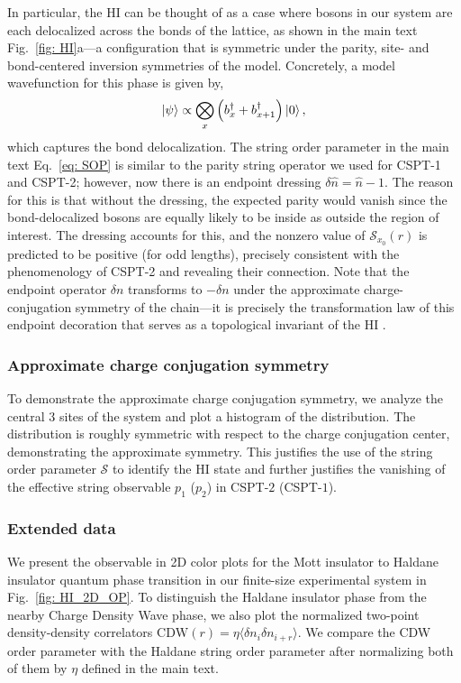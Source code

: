 \documentclass[preprint,superscriptaddress,floatfix, nofootinbib]{revtex4-2}
\begin{document}
In particular, the HI can be thought of as a case where bosons in our system are each delocalized across the bonds of the lattice, as shown in the main text Fig.~\ref{fig: HI}a---a configuration that is symmetric under the parity, site- and bond-centered inversion symmetries of the model.
%
Concretely, a model wavefunction for this phase is given by,
\begin{equation} \label{eq:model-wavefunction}
    \ket{\psi} \propto \bigotimes_{x} \left( b_{x}^{\dagger} + b_{x + 1}^{\dagger} \right) \ket{0},
\end{equation}
which captures the bond delocalization.
%
The string order parameter in the main text Eq.~\eqref{eq: SOP} is similar to the parity string operator we used for CSPT-1 and CSPT-2; however, now there is an endpoint dressing $\delta \hat n = \hat n-1$. The reason for this is that without the dressing, the expected parity would vanish since the bond-delocalized bosons are equally likely to be inside as outside the region of interest. The dressing accounts for this, and the nonzero value of $\mathcal{S}_{x_0} (r)$ is predicted to be positive (for odd lengths), precisely consistent with the phenomenology of CSPT-2 and revealing their connection.
%
Note that the endpoint operator $\delta n$ transforms to $-\delta n$ under the approximate charge-conjugation symmetry of the chain---it is precisely the transformation law of this endpoint decoration that serves as a topological invariant of the HI \cite{Pollmann2012, Schuch2011, Chen2011}.

\subsubsection*{Approximate charge conjugation symmetry}
To demonstrate the approximate charge conjugation symmetry, we analyze the central 3 sites of the system and plot a histogram of the distribution. The distribution is roughly symmetric with respect to the charge conjugation center, demonstrating the approximate symmetry.
%
This justifies the use of the string order parameter $\mathcal{S}$ to identify the HI state and further justifies the vanishing of the effective string observable $p_1$ ($p_2$) in CSPT-$2$ (CSPT-$1$).

\subsubsection*{Extended data}
We present the observable in 2D color plots for the Mott insulator to Haldane insulator quantum phase transition in our finite-size experimental system in Fig.~\ref{fig: HI_2D_OP}. To distinguish the Haldane insulator phase from the nearby Charge Density Wave phase, we also plot the normalized two-point density-density correlators $\mathrm{CDW}(r)=\eta\langle \delta n_i \delta n_{i+r} \rangle$. We compare the CDW order parameter with the Haldane string order parameter after normalizing both of them by $\eta$ defined in the main text.
\end{document}
